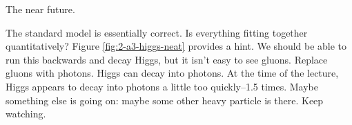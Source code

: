 \documentclass[]{article}
\begin{document}
\begin{appendices}
	The near future.
	
	The standard model is essentially correct. Is everything fitting together quantitatively? Figure \ref{fig:2-a3-higgs-neat} provides a hint. We should be able to run this backwards and decay Higgs, but it isn't easy to see gluons. Replace gluons with photons. Higgs can decay into photons. At the time of the lecture, Higgs appears to decay into photons a little too quickly--1.5 times. Maybe something else is going on: maybe some other heavy particle is there. Keep watching. 
	
\end{appendices}


\raggedright

\end{document}
